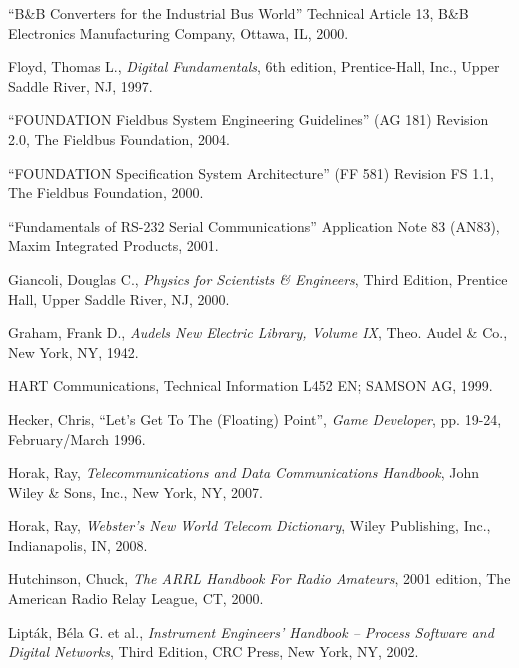 \noindent
``B\&B Converters for the Industrial Bus World'' Technical Article 13, B\&B Electronics Manufacturing Company, Ottawa, IL, 2000. 

\vskip 10pt

\noindent
Floyd, Thomas L., \textit{Digital Fundamentals}, 6th edition, Prentice-Hall, Inc., Upper Saddle River, NJ, 1997. 

\vskip 10pt

\noindent
``FOUNDATION Fieldbus System Engineering Guidelines'' (AG 181) Revision 2.0, The Fieldbus Foundation, 2004. 

\vskip 10pt

\noindent
``FOUNDATION Specification System Architecture'' (FF 581) Revision FS 1.1, The Fieldbus Foundation, 2000. 

\vskip 10pt

\noindent
``Fundamentals of RS-232 Serial Communications'' Application Note 83 (AN83), Maxim Integrated Products, 2001. 

\vskip 10pt

\noindent
Giancoli, Douglas C., \textit{Physics for Scientists \& Engineers}, Third Edition, Prentice Hall, Upper Saddle River, NJ, 2000.

\vskip 10pt

\noindent
Graham, Frank D., \textit{Audels New Electric Library, Volume IX}, Theo. Audel \& Co., New York, NY, 1942.

\vskip 10pt

\noindent
HART Communications, Technical Information L452 EN; SAMSON AG, 1999.

\vskip 10pt

\noindent
Hecker, Chris, ``Let's Get To The (Floating) Point'', \textit{Game Developer}, pp. 19-24, February/March 1996.

\vskip 10pt

\noindent
Horak, Ray, \textit{Telecommunications and Data Communications Handbook}, John Wiley \& Sons, Inc., New York, NY, 2007.

\vskip 10pt

\noindent
Horak, Ray, \textit{Webster's New World Telecom Dictionary}, Wiley Publishing, Inc., Indianapolis, IN, 2008.

\vskip 10pt

\noindent
Hutchinson, Chuck, \textit{The ARRL Handbook For Radio Amateurs}, 2001 edition, The American Radio Relay League, CT, 2000.

\vskip 10pt

\noindent
Lipt\'ak, B\'ela G. et al., \textit{Instrument Engineers' Handbook -- Process Software and Digital Networks}, Third Edition, CRC Press, New York, NY, 2002.

